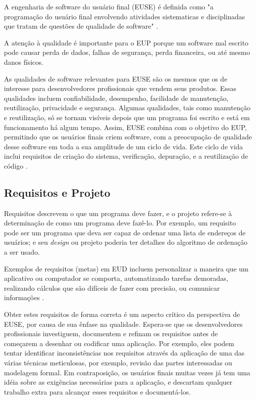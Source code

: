 A engenharia de software do usuário final (EUSE) é definida como "a programação do usuário final envolvendo atividades sistematicas e disciplinadas que tratam de questões de qualidade de software" \cite{ko2011state}.

A atenção à qualidade é importante para o EUP porque um software mal escrito pode causar perda de dados, falhas de segurança, perda financeira, ou até mesmo danos físicos.

As qualidades de software relevantes para EUSE são os mesmos que os de interesse para desenvolvedores profissionais que vendem seus produtos. Essas qualidades incluem confiabilidade, desempenho, facilidade de manutenção, reutilização, privacidade e segurança. Algumas qualidades, tais como manutenção e reutilização, só se tornam visíveis depois que um programa foi escrito e está em funcionamento há algum tempo. Assim, EUSE combina com o objetivo do EUP, permitindo que os usuários finais criem software, com a preocupação de qualidade desse software em toda a sua amplitude de um ciclo de vida. Este ciclo de vida inclui requisitos de criação do sistema, verificação, depuração, e a reutilização de código \cite{ko2011state}.

\subsection{Requisitos e Projeto}

Requisitos descrevem o que um programa deve fazer, e o projeto refere-se à determinação de como um programa deve fazê-lo. Por exemplo, um requisito pode ser um programa que deva ser capaz de ordenar uma lista de endereços de usuários; e seu \textit{design} ou projeto poderia ter detalhes do algoritmo de ordenação a ser usado.

Exemplos de requisitos (metas) em EUD incluem personalizar a maneira que um aplicativo ou computador se comporta, automatizando tarefas demoradas, realizando cálculos que são difíceis de fazer com precisão, ou comunicar informações \cite{ko2011state,blackwell2003notational,rosson2005minimalist}.

Obter estes requisitos de forma correta é um aspecto crítico da perspectiva de EUSE, por causa de sua ênfase na qualidade. Espera-se que os desenvolvedores profissionais investiguem, documentem e refinam os requisitos antes de começarem a desenhar ou codificar uma aplicação. Por exemplo, eles podem tentar identificar inconsistências nos requisitos através da aplicação de uma das várias técnicas meticulosas, por exemplo, revisão das partes interessadas ou modelagem formal. Em contraposição, os usuários finais muitas vezes já tem uma idéia sobre as exigências necessárias para a aplicação, e descartam qualquer trabalho extra para alcançar esses requisitos e documentá-los.

